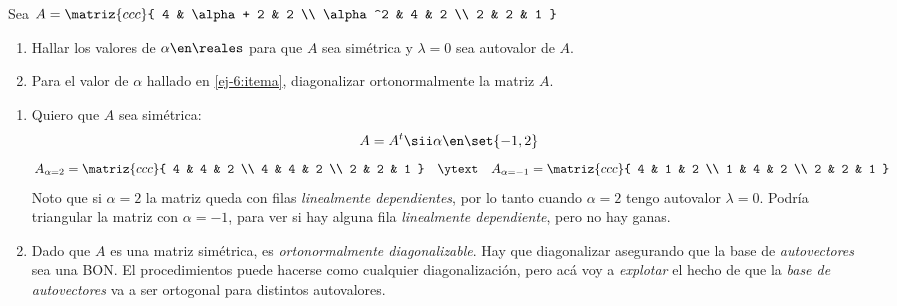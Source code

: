 \begin{enunciado}{\ejercicio}
  Sea $A =
    \matriz{ccc}{
      4 & \alpha + 2 & 2 \\
      \alpha^2 & 4 & 2 \\
      2 & 2 & 1
    }$
  \begin{enumerate}[label=(\alph*)]
    \item\label{ej-6:itema} Hallar los valores de $\alpha \en \reales$ para que $A$ sea simétrica y $\lambda = 0$ sea
          autovalor de $A$.

    \item Para el valor de $\alpha$ hallado en \ref{ej-6:itema}, diagonalizar ortonormalmente la matriz $A$.
  \end{enumerate}
\end{enunciado}

\begin{enumerate}[label=(\alph*)]
  \item Quiero que $A$ sea simétrica:
        $$
          A = A^t
          \sii
          \alpha \en \set{-1, 2}
        $$
        $$
          A_{\alpha = 2} =
          \matriz{ccc}{
            4 & 4 & 2 \\
            4 & 4 & 2 \\
            2 & 2 & 1
          }
          \quad
          \ytext
          \quad
          A_{\alpha = -1} =
          \matriz{ccc}{
            4 & 1 & 2 \\
            1 & 4 & 2 \\
            2 & 2 & 1
          }
        $$
        Noto que si $\alpha = 2$ la matriz queda con filas \textit{linealmente dependientes},
        por lo tanto cuando $\alpha = 2$ tengo autovalor $\lambda = 0$. Podría triangular la matriz con
        $\alpha = -1$, para ver si hay alguna fila \textit{linealmente dependiente}, pero no hay ganas.

  \item Dado que $A$ es una matriz simétrica, es \textit{ortonormalmente diagonalizable}. Hay que diagonalizar
        asegurando que la base de \textit{autovectores} sea una BON. El procedimientos puede hacerse como cualquier
        diagonalización, pero acá voy a \textit{explotar } el hecho de que la \textit{base de autovectores}
        va a ser ortogonal para distintos autovalores.


\end{enumerate}
